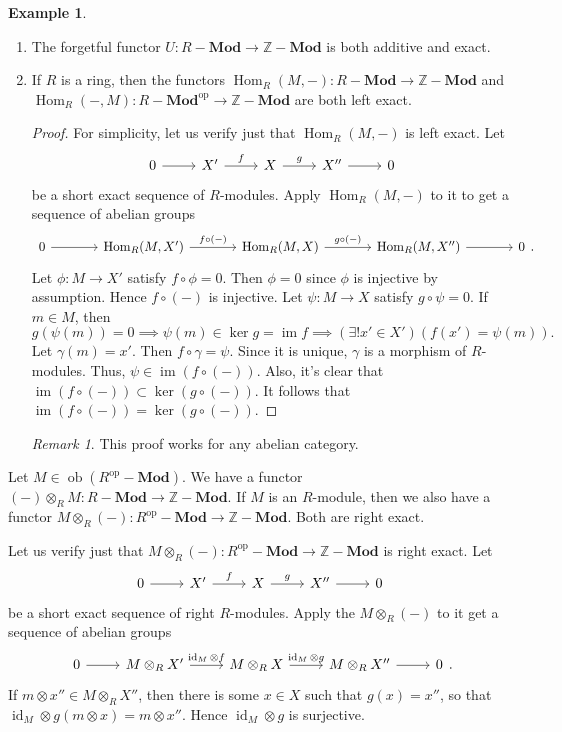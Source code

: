 \documentclass[10pt,letterpaper,cm]{nupset}
\theoremstyle{definition}
\newtheorem{exmp}[definition]{Example}
\theoremstyle{theorem}
\theoremstyle{remark}
\newtheorem{remark}[definition]{Remark}
\newcommand{\Z}{\mathbb Z}
\newcommand{\1}{\mathbf{1}}
\newcommand{\0}{\vec 0}
\DeclareMathOperator{\id}{\mathrm{id}}
\DeclareMathOperator{\op}{op}
\DeclareMathOperator{\im}{im}
\DeclareMathOperator{\ob}{ob}
\DeclareMathOperator{\Hom}{Hom}
\begin{document}
\begin{exmp} $ $
\begin{enumerate}
\item  The forgetful functor $U : R{-}\mathbf{Mod} \to \Z{-}\mathbf{Mod}$ is both additive and exact.
\item If $R$ is a ring, then the functors $\Hom_R(M, -) : R{-}\mathbf{Mod} \to \Z{-}\mathbf{Mod}$ and $\Hom_R(-, M) :R{-}\mathbf{Mod}^{\op} \to \Z{-} \mathbf{Mod}$ are both left exact.
\begin{proof}
For simplicity, let us verify just that $\Hom_R(M, -)$ is left exact. Let 
\[
\begin{tikzcd}
0 \arrow[r] & X' \arrow[r, "f"] & X \arrow[r, "g"] & X'' \arrow[r] & 0
\end{tikzcd} 
\] be a short exact sequence of $R$-modules. Apply $\Hom_R(M, -)$ to it to get a sequence of abelian groups
\[
\begin{tikzcd}[column sep = large]
0 \arrow[r] & {\Hom_R(M, X')} \arrow[r, "f\circ (-)"] & {\Hom_R(M,X)} \arrow[r, "g\circ (-)"] & {\Hom_R(M, X'')} \arrow[r] & 0
\end{tikzcd}
.\]
Let $\phi : M \to X'$ satisfy $f \circ \phi = 0$. Then $\phi =0$ since $\phi$ is injective by assumption. Hence $f \circ (-)$ is injective.  Let $\psi : M \to X$ satisfy $g \circ \psi =0$. If $m \in M$, then $$g(\psi(m)) =0 \implies \psi(m) \in \ker{g} = \im f \implies \left(\exists!x' \in X'\right)\left(f(x') = \psi(m)\right).$$ Let $\gamma(m) = x'.$ Then $f \circ \gamma  = \psi$. Since it is unique, $\gamma$ is a morphism of $R$-modules. Thus, $\psi \in \im(f \circ (-))$. Also, it's clear that $\im(f \circ (-)) \subset \ker(g \circ (-))$. It follows that $\im(f \circ (-)) = \ker(g \circ (-))$.
\end{proof}
\begin{remark}
This proof works for any abelian category.
\end{remark}
\end{enumerate}
\end{exmp}

\medskip

Let $M \in \ob(R^{\op}{-}\mathbf{Mod})$. We have a functor $\left({-}\right) \otimes_R M : R{-}\mathbf{Mod} \to \Z {-}\mathbf{Mod}$. If $M$ is an $R$-module, then we also have a functor $M \otimes_R (-) : R^{\op}{-}\mathbf{Mod} \to \Z{-}\mathbf{Mod}$. Both are right exact.

Let us verify just that $M \otimes_R (-) : R^{\op}{-}\mathbf{Mod} \to \Z{-}\mathbf{Mod}$ is right exact.  Let 
\[
\begin{tikzcd}
0 \arrow[r] & X' \arrow[r, "f"] & X \arrow[r, "g"] & X'' \arrow[r] & 0
\end{tikzcd} 
\] be a short exact sequence of  right $R$-modules. Apply the $M \otimes_R (-)$ to it get a sequence of abelian groups
\[
\begin{tikzcd}
0 \arrow[r] & M\otimes_R X' \arrow[r, "\id_M \otimes f"] & M\otimes_R X \arrow[r, "\id_M \otimes g"] & M\otimes_R X'' \arrow[r] & 0
\end{tikzcd}.
\]
If $ m \otimes x'' \in M \otimes_R X''$, then there is some $x \in X$ such that $g(x) = x''$, so that $\id_M \otimes g(m \otimes x) = m\otimes x''$. Hence $\id_M \otimes g$ is surjective. 
\end{document}

